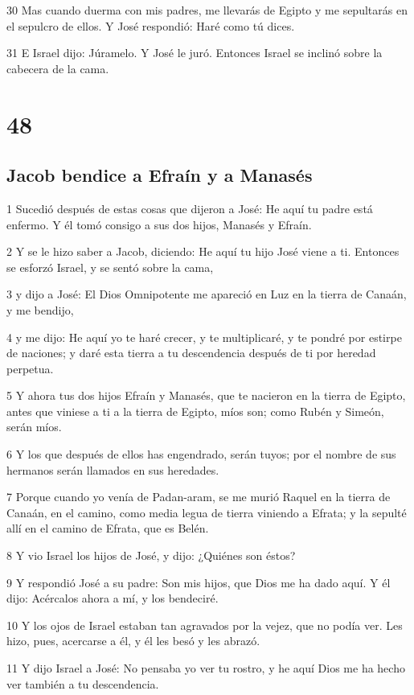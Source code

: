 30 Mas cuando duerma con mis padres, me llevarás de Egipto y me sepultarás en el sepulcro de ellos. Y José respondió: Haré como tú dices.

31 E Israel dijo: Júramelo. Y José le juró. Entonces Israel se inclinó sobre la cabecera de la cama.

\chapter{48}

\section{Jacob bendice a Efraín y a Manasés}

1  Sucedió después de estas cosas que dijeron a José: He aquí tu padre está enfermo. Y él tomó consigo a sus dos hijos, Manasés y Efraín.

2 Y se le hizo saber a Jacob, diciendo: He aquí tu hijo José viene a ti. Entonces se esforzó Israel, y se sentó sobre la cama,

3 y dijo a José: El Dios Omnipotente me apareció en Luz en la tierra de Canaán, y me bendijo,

4 y me dijo: He aquí yo te haré crecer, y te multiplicaré, y te pondré por estirpe de naciones; y daré esta tierra a tu descendencia después de ti por heredad perpetua.

5 Y ahora tus dos hijos Efraín y Manasés, que te nacieron en la tierra de Egipto, antes que viniese a ti a la tierra de Egipto, míos son; como Rubén y Simeón, serán míos.

6 Y los que después de ellos has engendrado, serán tuyos; por el nombre de sus hermanos serán llamados en sus heredades.

7 Porque cuando yo venía de Padan-aram, se me murió Raquel en la tierra de Canaán, en el camino, como media legua de tierra viniendo a Efrata; y la sepulté allí en el camino de Efrata, que es Belén.

8 Y vio Israel los hijos de José, y dijo: ¿Quiénes son éstos?

9 Y respondió José a su padre: Son mis hijos, que Dios me ha dado aquí. Y él dijo: Acércalos ahora a mí, y los bendeciré.

10 Y los ojos de Israel estaban tan agravados por la vejez, que no podía ver. Les hizo, pues, acercarse a él, y él les besó y les abrazó.

11 Y dijo Israel a José: No pensaba yo ver tu rostro, y he aquí Dios me ha hecho ver también a tu descendencia.

